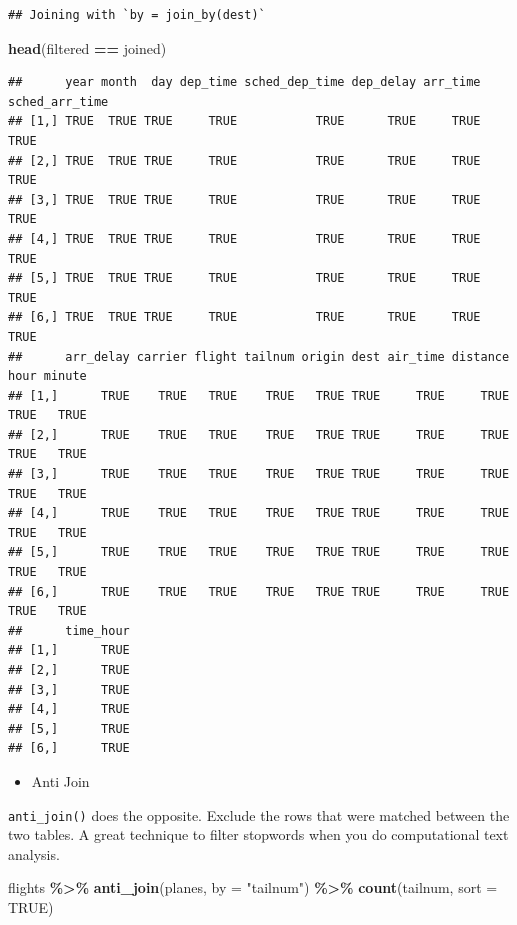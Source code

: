 \documentclass[
]{book}
\newenvironment{Shaded}{\begin{snugshade}}{\end{snugshade}}
\newcommand{\AttributeTok}[1]{\textcolor[rgb]{0.13,0.29,0.53}{#1}}
\newcommand{\ConstantTok}[1]{\textcolor[rgb]{0.56,0.35,0.01}{#1}}
\newcommand{\FunctionTok}[1]{\textcolor[rgb]{0.13,0.29,0.53}{\textbf{#1}}}
\newcommand{\NormalTok}[1]{#1}
\newcommand{\SpecialCharTok}[1]{\textcolor[rgb]{0.81,0.36,0.00}{\textbf{#1}}}
\newcommand{\StringTok}[1]{\textcolor[rgb]{0.31,0.60,0.02}{#1}}
\providecommand{\tightlist}{%
  \setlength{\itemsep}{0pt}\setlength{\parskip}{0pt}}
\begin{document}
\begin{verbatim}
## Joining with `by = join_by(dest)`
\end{verbatim}

\begin{Shaded}
\begin{Highlighting}[]
\FunctionTok{head}\NormalTok{(filtered }\SpecialCharTok{==}\NormalTok{ joined)}
\end{Highlighting}
\end{Shaded}

\begin{verbatim}
##      year month  day dep_time sched_dep_time dep_delay arr_time sched_arr_time
## [1,] TRUE  TRUE TRUE     TRUE           TRUE      TRUE     TRUE           TRUE
## [2,] TRUE  TRUE TRUE     TRUE           TRUE      TRUE     TRUE           TRUE
## [3,] TRUE  TRUE TRUE     TRUE           TRUE      TRUE     TRUE           TRUE
## [4,] TRUE  TRUE TRUE     TRUE           TRUE      TRUE     TRUE           TRUE
## [5,] TRUE  TRUE TRUE     TRUE           TRUE      TRUE     TRUE           TRUE
## [6,] TRUE  TRUE TRUE     TRUE           TRUE      TRUE     TRUE           TRUE
##      arr_delay carrier flight tailnum origin dest air_time distance hour minute
## [1,]      TRUE    TRUE   TRUE    TRUE   TRUE TRUE     TRUE     TRUE TRUE   TRUE
## [2,]      TRUE    TRUE   TRUE    TRUE   TRUE TRUE     TRUE     TRUE TRUE   TRUE
## [3,]      TRUE    TRUE   TRUE    TRUE   TRUE TRUE     TRUE     TRUE TRUE   TRUE
## [4,]      TRUE    TRUE   TRUE    TRUE   TRUE TRUE     TRUE     TRUE TRUE   TRUE
## [5,]      TRUE    TRUE   TRUE    TRUE   TRUE TRUE     TRUE     TRUE TRUE   TRUE
## [6,]      TRUE    TRUE   TRUE    TRUE   TRUE TRUE     TRUE     TRUE TRUE   TRUE
##      time_hour
## [1,]      TRUE
## [2,]      TRUE
## [3,]      TRUE
## [4,]      TRUE
## [5,]      TRUE
## [6,]      TRUE
\end{verbatim}

\begin{itemize}
\tightlist
\item
  Anti Join
\end{itemize}

\texttt{anti\_join()} does the opposite. Exclude the rows that were matched between the two tables. A great technique to filter stopwords when you do computational text analysis.

\begin{Shaded}
\begin{Highlighting}[]
\NormalTok{flights }\SpecialCharTok{\%\textgreater{}\%}
  \FunctionTok{anti\_join}\NormalTok{(planes, }\AttributeTok{by =} \StringTok{"tailnum"}\NormalTok{) }\SpecialCharTok{\%\textgreater{}\%}
  \FunctionTok{count}\NormalTok{(tailnum, }\AttributeTok{sort =} \ConstantTok{TRUE}\NormalTok{)}
\end{Highlighting}
\end{Shaded}
\end{document}
